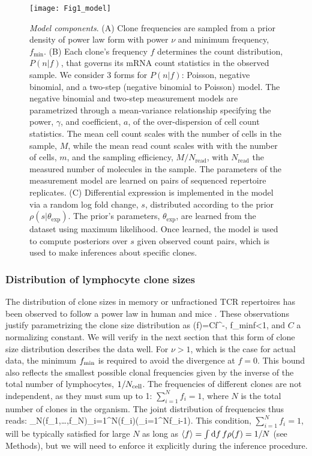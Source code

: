 \begin{figure*}
\texttt{[image: Fig1\_model]}
\centering{}
\caption{
\emph{Model components}. (A) Clone frequencies are sampled from a prior density of power law form with power $\nu$ and minimum frequency, $f_\textrm{min}$. (B) Each clone's frequency $f$ determines the count distribution, $P(n|f)$, that governs its mRNA count statistics in the observed sample. We consider 3 forms for $P(n|f)$: Poisson, negative binomial, and a two-step (negative binomial to Poisson) model. The negative binomial and two-step measurement models are parametrized through a mean-variance relationship specifying the power, $\gamma$, and coefficient, $a$, of the over-dispersion of cell count statistics. The mean cell count scales with the number of cells in the sample, $M$, while the mean read count scales with with the number of cells, $m$, and the sampling efficiency, $M/N_{\textrm{read}}$, with $N_{\textrm{read}}$ the measured number of molecules in the sample. The parameters of the measurement model are learned on pairs of sequenced repertoire replicates.  (C) Differential expression is implemented in the model via a random log fold change, $s$, distributed according to the prior $\rho(s|\theta_\textrm{exp})$. The prior's parameters, $\theta_\textrm{exp}$, are learned from the dataset using maximum likelihood. Once learned, the model is used to compute posteriors over $s$ given observed count pairs, which is used to make inferences about specific clones.
\label{fig:fullmodel}}
\end{figure*}

\subsubsection*{Distribution of lymphocyte clone sizes}

The distribution of clone sizes in memory or unfractioned TCR repertoires has been observed to follow a power law in human \cite{Mora2016e,Gerritsen_thesis,Greef2019} and mice \cite{Zarnitsyna2013,Heather2017}. These observations justify parametrizing the clone size distribution as
\beq
\rho(f)=Cf^{-\nu}, \qquad f_{\rm min}\leq f<1,
\eeq
and $C$ a normalizing constant. 
We will verify in the next section that this form of clone size distribution describes the data well.
For $\nu>1$, which is the case for actual data, the minimum $f_{\rm min}$ is required to avoid the divergence at $f=0$. This bound also reflects the smallest possible clonal frequencies given by the inverse of the total number of lymphocytes, $1/N_{\rm cell}$. The frequencies of different clones are not independent, as they must sum up to 1: $\sum_{i=1}^Nf_i=1$, where $N$ is the total number of clones in the organism. The joint distribution of frequencies thus reads:
\beq
\rho_N(f_1,\ldots,f_N)\propto\prod_{i=1}^N\rho(f_i)\delta\left(\sum_{i=1}^Nf_i-1\right).
\eeq
This condition, $\sum_{i=1}^Nf_i=1$, will be typically satisfied for large $N$ as long as $\langle f\rangle=\int \textrm{d}f \,f\rho(f) = 1/N$ (see Methods), but we will need to enforce it explicitly during the inference procedure. 

